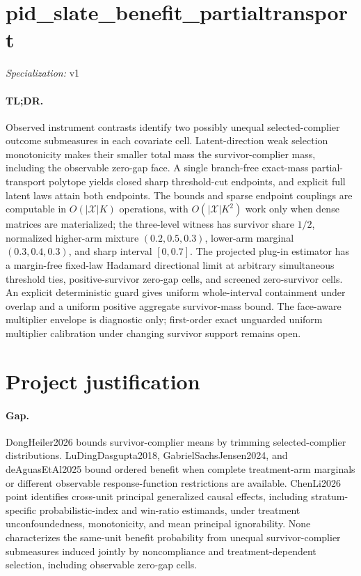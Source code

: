 \documentclass{article}
\begin{document}
\sloppy

\section*{pid\_\allowbreak{}slate\_\allowbreak{}benefit\_\allowbreak{}partialtransport}

\noindent\textit{Specialization:} v1\par

\paragraph{TL;DR.} Observed instrument contrasts identify two possibly unequal selected-complier outcome submeasures in each covariate cell. Latent-direction weak selection monotonicity makes their smaller total mass the survivor-complier mass, including the observable zero-gap face. A single branch-free exact-mass partial-transport polytope yields closed sharp threshold-cut endpoints, and explicit full latent laws attain both endpoints. The bounds and sparse endpoint couplings are computable in \(O(|\mathcal X|K)\) operations, with \(O(|\mathcal X|K^2)\) work only when dense matrices are materialized; the three-level witness has survivor share \(1/2\), normalized higher-arm mixture \((0.2,0.5,0.3)\), lower-arm marginal \((0.3,0.4,0.3)\), and sharp interval \([0,0.7]\). The projected plug-in estimator has a margin-free fixed-law Hadamard directional limit at arbitrary simultaneous threshold ties, positive-survivor zero-gap cells, and screened zero-survivor cells. An explicit deterministic guard gives uniform whole-interval containment under overlap and a uniform positive aggregate survivor-mass bound. The face-aware multiplier envelope is diagnostic only; first-order exact unguarded uniform multiplier calibration under changing survivor support remains open.

\section{Project justification}

\paragraph{Gap.} DongHeiler2026 bounds survivor-complier means by trimming selected-complier distributions. LuDingDasgupta2018, GabrielSachsJensen2024, and deAguasEtAl2025 bound ordered benefit when complete treatment-arm marginals or different observable response-function restrictions are available. ChenLi2026 point identifies cross-unit principal generalized causal effects, including stratum-specific probabilistic-index and win-ratio estimands, under treatment unconfoundedness, monotonicity, and mean principal ignorability. None characterizes the same-unit benefit probability from unequal survivor-complier submeasures induced jointly by noncompliance and treatment-dependent selection, including observable zero-gap cells.
\end{document}
